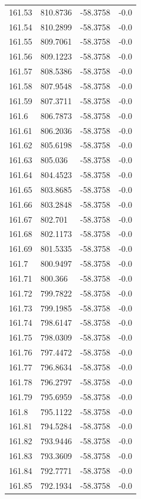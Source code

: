 \begin{table}[H]
\begin{tabular}{llll}
161.53 & 810.8736 & -58.3758 & -0.0 \\
161.54 & 810.2899 & -58.3758 & -0.0 \\
161.55 & 809.7061 & -58.3758 & -0.0 \\
161.56 & 809.1223 & -58.3758 & -0.0 \\
161.57 & 808.5386 & -58.3758 & -0.0 \\
161.58 & 807.9548 & -58.3758 & -0.0 \\
161.59 & 807.3711 & -58.3758 & -0.0 \\
161.6 & 806.7873 & -58.3758 & -0.0 \\
161.61 & 806.2036 & -58.3758 & -0.0 \\
161.62 & 805.6198 & -58.3758 & -0.0 \\
161.63 & 805.036 & -58.3758 & -0.0 \\
161.64 & 804.4523 & -58.3758 & -0.0 \\
161.65 & 803.8685 & -58.3758 & -0.0 \\
161.66 & 803.2848 & -58.3758 & -0.0 \\
161.67 & 802.701 & -58.3758 & -0.0 \\
161.68 & 802.1173 & -58.3758 & -0.0 \\
161.69 & 801.5335 & -58.3758 & -0.0 \\
161.7 & 800.9497 & -58.3758 & -0.0 \\
161.71 & 800.366 & -58.3758 & -0.0 \\
161.72 & 799.7822 & -58.3758 & -0.0 \\
161.73 & 799.1985 & -58.3758 & -0.0 \\
161.74 & 798.6147 & -58.3758 & -0.0 \\
161.75 & 798.0309 & -58.3758 & -0.0 \\
161.76 & 797.4472 & -58.3758 & -0.0 \\
161.77 & 796.8634 & -58.3758 & -0.0 \\
161.78 & 796.2797 & -58.3758 & -0.0 \\
161.79 & 795.6959 & -58.3758 & -0.0 \\
161.8 & 795.1122 & -58.3758 & -0.0 \\
161.81 & 794.5284 & -58.3758 & -0.0 \\
161.82 & 793.9446 & -58.3758 & -0.0 \\
161.83 & 793.3609 & -58.3758 & -0.0 \\
161.84 & 792.7771 & -58.3758 & -0.0 \\
161.85 & 792.1934 & -58.3758 & -0.0 \\

\end{tabular}
\end{table}
